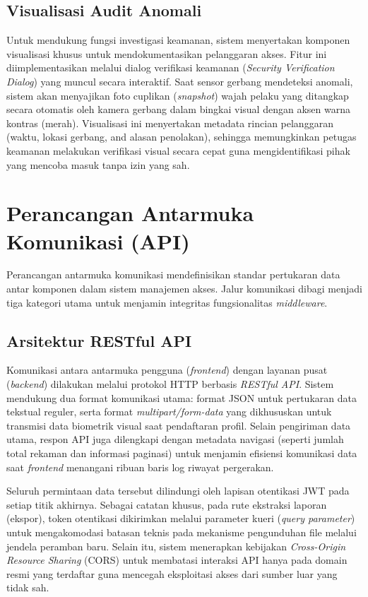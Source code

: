 \subsection{Visualisasi Audit Anomali}
Untuk mendukung fungsi investigasi keamanan, sistem menyertakan komponen visualisasi khusus untuk mendokumentasikan pelanggaran akses. Fitur ini diimplementasikan melalui dialog verifikasi keamanan (\textit{Security Verification Dialog}) yang muncul secara interaktif. Saat sensor gerbang mendeteksi anomali, sistem akan menyajikan foto cuplikan (\textit{snapshot}) wajah pelaku yang ditangkap secara otomatis oleh kamera gerbang dalam bingkai visual dengan aksen warna kontras (merah). Visualisasi ini menyertakan metadata rincian pelanggaran (waktu, lokasi gerbang, and alasan penolakan), sehingga memungkinkan petugas keamanan melakukan verifikasi visual secara cepat guna mengidentifikasi pihak yang mencoba masuk tanpa izin yang sah.

\section{Perancangan Antarmuka Komunikasi (API)}
Perancangan antarmuka komunikasi mendefinisikan standar pertukaran data antar komponen dalam sistem manajemen akses. Jalur komunikasi dibagi menjadi tiga kategori utama untuk menjamin integritas fungsionalitas \textit{middleware}.

\subsection{Arsitektur RESTful API}
Komunikasi antara antarmuka pengguna (\textit{frontend}) dengan layanan pusat (\textit{backend}) dilakukan melalui protokol HTTP berbasis \textit{RESTful API}. Sistem mendukung dua format komunikasi utama: format JSON untuk pertukaran data tekstual reguler, serta format \textit{multipart/form-data} yang dikhususkan untuk transmisi data biometrik visual saat pendaftaran profil. Selain pengiriman data utama, respon API juga dilengkapi dengan metadata navigasi (seperti jumlah total rekaman dan informasi paginasi) untuk menjamin efisiensi komunikasi data saat \textit{frontend} menangani ribuan baris log riwayat pergerakan. 

Seluruh permintaan data tersebut dilindungi oleh lapisan otentikasi JWT pada setiap titik akhirnya. Sebagai catatan khusus, pada rute ekstraksi laporan (ekspor), token otentikasi dikirimkan melalui parameter kueri (\textit{query parameter}) untuk mengakomodasi batasan teknis pada mekanisme pengunduhan file melalui jendela peramban baru. Selain itu, sistem menerapkan kebijakan \textit{Cross-Origin Resource Sharing} (CORS) untuk membatasi interaksi API hanya pada domain resmi yang terdaftar guna mencegah eksploitasi akses dari sumber luar yang tidak sah. 

